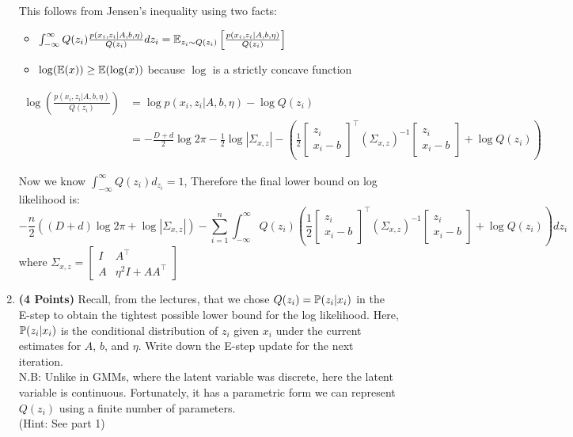 \begin{enumerate}
\begin{soln}
    This follows from Jensen's inequality using two facts:
    \begin{itemize}
        \item $\int_{-\infty}^{\infty}Q(z_i)\frac{p(x_i,z_i|A,b,\eta)}{Q(z_i)}dz_i = \mathbb E_{z_i \sim Q(z_i)}\left[\frac{p(x_i,z_i|A,b,\eta)}{Q(z_i)}\right] $
        \item $\log(\mathbb E(x)) \geq \mathbb E(\log(x))$ because $\log$ is a strictly concave function
    \end{itemize}
    
    \begin{align*}
        \log{\left(\frac{p(x_i,z_i|A,b,\eta)}{Q(z_i)}\right)} &= \log{p(x_i,z_i|A,b,\eta)} - \log{Q(z_i)} \\
        &= -\frac{D+d}{2}\log{2\pi} -\frac{1}{2}\log{|\Sigma_{x,z}|}-\left(\frac{1}{2}\left[\begin{array}{c} z_i \\ x_i-b \end{array} \right]^\top(\Sigma_{x,z})^{-1}\left[\begin{array}{c} z_i \\ x_i-b \end{array} \right] + \log{Q(z_i)}\right)
    \end{align*}

    Now we know $\int_{-\infty}^{\infty}Q(z_i)d_{z_i}=1$, Therefore the final lower bound on log likelihood is:
    $$
    -\frac{n}{2}\left((D+d)\log{2\pi}+\log{|\Sigma_{x,z}|}\right) - \sum_{i=1}^n\int_{-\infty}^{\infty}Q(z_i)\left(\frac{1}{2}\left[\begin{array}{c} z_i \\ x_i-b \end{array} \right]^\top(\Sigma_{x,z})^{-1}\left[\begin{array}{c} z_i \\ x_i-b \end{array} \right] + \log{Q(z_i)} \right)dz_i
    $$
    where $\Sigma_{x,z} = \left[ \begin{array}{cc} I & A^\top \\ A & \eta^2I + AA^\top \end{array} \right]$
\end{soln}

\item \textbf{(4 Points)}
Recall, from the lectures, that we chose
$Q(z_i) =  \mathbb{P}(z_i|x_i)$ in the E-step to obtain the tightest
possible lower bound for the log likelihood.
Here, $ \mathbb{P}(z_i|x_i)$ is the conditional distribution of $z_i$
given $x_i$ under the current estimates for $A$, $b$, and $\eta$.
Write down the E-step update for the next iteration. \\
N.B: Unlike in GMMs, where the latent variable was discrete, here the latent variable is continuous. Fortunately, it has a parametric form we can represent $Q(z_i)$ using a finite number of parameters. \\
(Hint: See part 1)


\end{enumerate}
